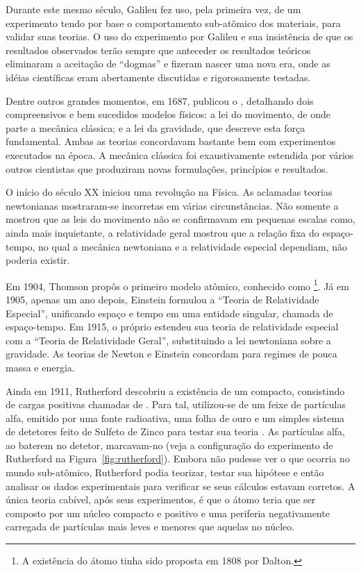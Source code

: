 Durante este mesmo século, Galileu fez uso, pela primeira vez, de um
experimento tendo por base o comportamento sub-atômico dos materiais, para
validar suas teorias. O uso do experimento por Galileu e sua insistência de
que os resultados observados terão sempre que anteceder os resultados teóricos
eliminaram a aceitação de ``dogmas'' e fizeram nascer uma nova era, onde as
idéias científicas eram abertamente discutidas e rigorosamente testadas.

Dentre outros grandes momentos, em 1687,  publicou o
, detalhando dois compreensivos e bem sucedidos
modelos físicos: a lei do movimento, de onde parte a mecânica clássica; e a
lei da gravidade, que descreve esta força fundamental. Ambas as teorias
concordavam bastante bem com experimentos executados na época. A mecânica
clássica foi exaustivamente estendida por vários outros cientistas que
produziram novas formulações, princípios e resultados.

O início do século XX iniciou uma revolução na Física. As aclamadas teorias
newtonianas mostraram-se incorretas em várias circunstâncias. Não somente a
 mostrou que as leis do movimento não se confirmavam em
pequenas escalas como, ainda mais inquietante, a relatividade geral mostrou
que a relação fixa do espaço-tempo, no qual a mecânica newtoniana e a
relatividade especial dependiam, não poderia existir.

Em 1904, Thomson propôs o primeiro modelo atômico, conhecido como
\footnote{A existência do átomo tinha sido proposta
em 1808 por Dalton.}. Já em 1905, apenas um ano depois, Einstein formulou a
``Teoria de Relatividade Especial'', unificando espaço e tempo em uma entidade
singular, chamada de espaço-tempo. Em 1915, o próprio estendeu sua teoria de
relatividade especial com a ``Teoria de Relatividade Geral'', substituindo a
lei newtoniana sobre a gravidade. As teorias de Newton e Einstein concordam
para regimes de pouca massa e energia.

Ainda em 1911, Rutherford descobriu a existência de um 
compacto, consistindo de cargas positivas chamadas de . Para tal,
utilizou-se de um feixe de partículas alfa, emitido por uma fonte radioativa,
uma folha de ouro e um simples sistema de detetores feito de Sulfeto de Zinco
para testar sua teoria \cite{halliday}. As partículas alfa, ao baterem no
detetor, marcavam-no (veja a configuração do experimento de Rutherford na
Figura~\ref{fig:rutherford}). Embora não pudesse ver o que ocorria no mundo
sub-atômico, Rutherford podia teorizar, testar sua hipótese e então analisar
os dados experimentais para verificar se seus cálculos estavam corretos. A
única teoria cabível, após seus experimentos, é que o átomo teria que ser
composto por um núcleo compacto e positivo e uma periferia negativamente
carregada de partículas mais leves e menores que aquelas no núcleo.

